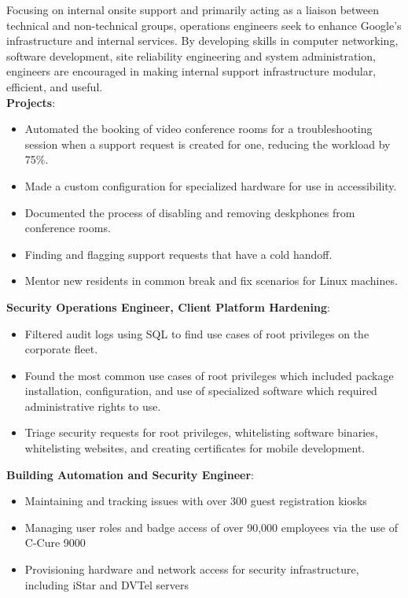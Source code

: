 \documentclass[letter,sans]{moderncv}
\begin{document}
{Focusing on internal onsite support and primarily acting as a liaison between technical and non-technical groups, operations engineers seek to enhance Google's infrastructure and internal services. By developing skills in computer networking, software development, site reliability engineering and system administration, engineers are encouraged in making internal support infrastructure modular, efficient, and useful.\\
  \textbf{Projects}:
  \begin{itemize}
    \item Automated the booking of video conference rooms for a troubleshooting session when a support request is created for one, reducing the workload by 75\%.
    \item Made a custom configuration for specialized hardware for use in accessibility.
    \item Documented the process of disabling and removing deskphones from conference rooms.
    \item Finding and flagging support requests that have a cold handoff.
    \item Mentor new residents in common break and fix scenarios for Linux machines.
  \end{itemize}
  \textbf{Security Operations Engineer, Client Platform Hardening}:
  \begin{itemize}
    \item Filtered audit logs using SQL to find use cases of root privileges on the corporate fleet.
    \item Found the most common use cases of root privileges which included package installation, configuration, and use of specialized software which required administrative rights to use.
    \item Triage security requests for root privileges, whitelisting software binaries, whitelisting websites, and creating certificates for mobile development.
  \end{itemize}
  \textbf{Building Automation and Security Engineer}:
  \begin{itemize}
    \item Maintaining and tracking issues with over 300 guest registration kiosks
    \item Managing user roles and badge access of over 90,000 employees via the use of C-Cure 9000
    \item Provisioning hardware and network access for security infrastructure, including iStar and DVTel servers
  \end{itemize}
}
  
\end{document}

